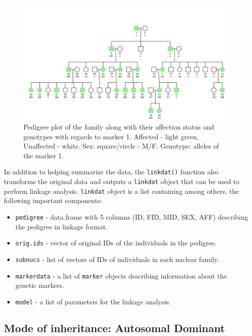\documentclass[a4paper,12pt]{article}
\begin{document}
\begin{figure}[ht!] %
    \centering
    \includegraphics[width=\textwidth]{images/pedigree_plot.png}
    \caption{Pedigree plot of the family along with their affection status and genotypes with 
    regards to marker 1.
    Affected - light green, Unaffected - white. Sex: square/circle - M/F. Genotype: alleles of the marker 1.}
    \label{fig:pedigree} %

    
\end{figure}

In addition to helping summarize the data, the \texttt{linkdat()} function also transforms the original data
and outputs a \texttt{linkdat} object that can be used to perform linkage analysis. \texttt{linkdat} object 
is a list containing among others, the following important components:
\begin{itemize}
    \item \texttt{pedigree} - data.frame with 5 columns (ID, FID, MID, SEX, AFF) describing the pedigree in linkage format.
    \item \texttt{orig.ids} - vector of original IDs of the individuals in the pedigree.
    \item \texttt{subnucs} - list of vectors of IDs of individuals in each nuclear family.
    \item \texttt{markerdata} - a list of \texttt{marker} objects describing information about the genetic markers.
\item \texttt{model} - a list of parameters for the linkage analysis.
\end{itemize}



\subsection{Mode of inheritance: Autosomal Dominant}
\end{document}
